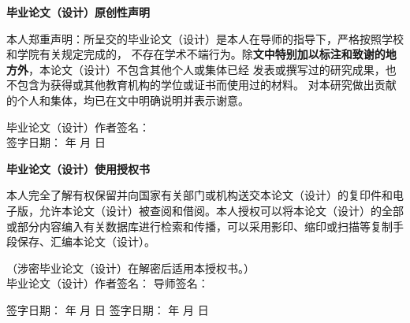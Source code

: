 
\begin{center}
    \bfseries {} 毕业论文（设计）原创性声明
\end{center}

{
    本人郑重声明：所呈交的毕业论文（设计）是本人在导师的指导下，严格按照学校和学院有关规定完成的，
    不存在学术不端行为。除\textbf{文中特别加以标注和致谢的地方外}，本论文（设计）不包含其他个人或集体已经
    发表或撰写过的研究成果，也不包含为获得或其他教育机构的学位或证书而使用过的材料。
    对本研究做出贡献的个人和集体，均已在文中明确说明并表示谢意。

    \begin{flushright}
        毕业论文（设计）作者签名：\makebox[7.7em]{}\\
        签字日期：\hspace{1.4em} 年 \hspace{1em} 月 \hspace{1em} 日
    \end{flushright}
}
    \mbox{} \vfill
    
\begin{center}
        \bfseries {} 毕业论文（设计）使用授权书
\end{center}

{   
    本人完全了解有权保留并向国家有关部门或机构送交本论文（设计）的复印件和电子版，允许本论文（设计）被查阅和借阅。本人授权可以将本论文（设计）的全部或部分内容编入有关数据库进行检索和传播，可以采用影印、缩印或扫描等复制手段保存、汇编本论文（设计）。
    
    （涉密毕业论文（设计）在解密后适用本授权书。）\\
    
    \noindent
    毕业论文（设计）作者签名：\makebox[3.5cm]{}
    导师签名：\makebox[3.5cm]{}

    \vspace{0.8em}

    \noindent
    签字日期：\hspace{1.4em} 年 \hspace{1em} 月 \hspace{1em} 日
    \hfill
    签字日期：\hspace{1.4em} 年 \hspace{1em} 月 \hspace{1em} 日
}
    